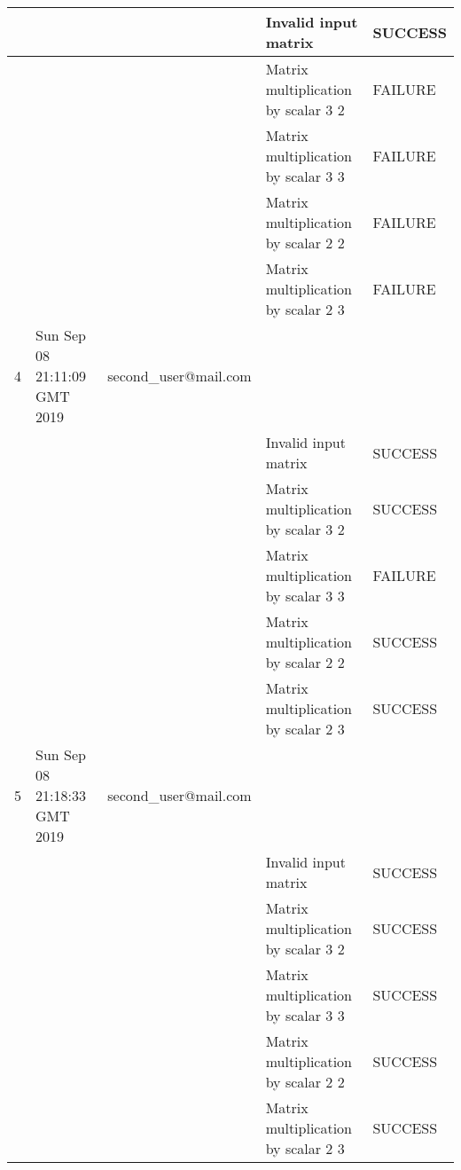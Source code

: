 \begin{table}[H]
{\begin{tabular}{|l|l|l|l|l|}
    &                              &                                 & Invalid input matrix                & SUCCESS \\ \hline
    &                              &                                 & Matrix multiplication by scalar 3 2 & FAILURE \\ \hline
    &                              &                                 & Matrix multiplication by scalar 3 3 & FAILURE \\ \hline
    &                              &                                 & Matrix multiplication by scalar 2 2 & FAILURE \\ \hline
    &                              &                                 & Matrix multiplication by scalar 2 3 & FAILURE \\ \hline
    4     & Sun Sep 08 21:11:09 GMT 2019 & second\_user@mail.com               &                                     &         \\ \hline
    &                              &                                 & Invalid input matrix                & SUCCESS \\ \hline
    &                              &                                 & Matrix multiplication by scalar 3 2 & SUCCESS \\ \hline
    &                              &                                 & Matrix multiplication by scalar 3 3 & FAILURE \\ \hline
    &                              &                                 & Matrix multiplication by scalar 2 2 & SUCCESS \\ \hline
    &                              &                                 & Matrix multiplication by scalar 2 3 & SUCCESS \\ \hline
    5     & Sun Sep 08 21:18:33 GMT 2019 & second\_user@mail.com               &                                     &         \\ \hline
    &                              &                                 & Invalid input matrix                & SUCCESS \\ \hline
    &                              &                                 & Matrix multiplication by scalar 3 2 & SUCCESS \\ \hline
    &                              &                                 & Matrix multiplication by scalar 3 3 & SUCCESS \\ \hline
    &                              &                                 & Matrix multiplication by scalar 2 2 & SUCCESS \\ \hline
    &                              &                                 & Matrix multiplication by scalar 2 3 & SUCCESS \\ \hline
\end{tabular}
\label{tab:matrix_multiplication_by_scalar}
}
\end{table}